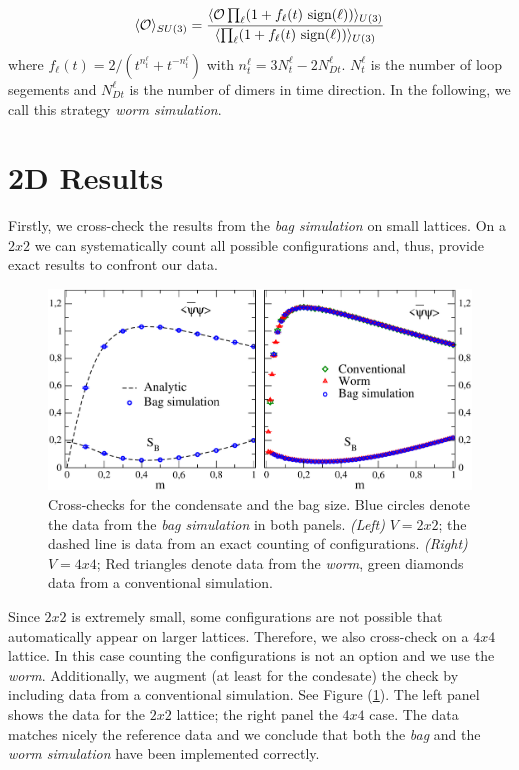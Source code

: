 \documentclass{PoS}
\begin{document}
\begin{equation}
\langle \mathcal{O} \rangle_{\tiny SU(3)} = \frac{\langle \mathcal{O} \prod_{\ell}(1 + f_{\ell}(t)\text{ sign}(\ell)) \rangle_{\tiny U(3)}}{\langle \prod_{\ell}(1 + f_{\ell}(t)\text{ sign}(\ell)) \rangle_{\tiny U(3)}}
\end{equation}
where $f_{\ell}(t) = 2/(t^{n^{\ell}_t} + t^{-n^{\ell}_t})$ with $n^{\ell}_t = 3N^{\ell}_t - 2N^{\ell}_{Dt}$. $N^{\ell}_t$ is the number of loop segements and $N^{\ell}_{Dt}$ is the number of dimers in time direction. In the following, we call this strategy \textit{worm simulation}.

\section{2D Results}

Firstly, we cross-check the results from the \textit{bag simulation} on small lattices. On a $2x2$ we can systematically count all possible configurations and, thus, provide exact results to confront our data. 
\begin{figure}
\centering
\includegraphics[width=0.7\linewidth]{Plots/Checks/Comb/V2n4_SB_cond_m0to1_combined.pdf}
\caption{Cross-checks for the condensate and the bag size. Blue circles denote the data from the \textit{bag simulation} in both panels. \textit{(Left)} $V = 2x2$; the dashed line is data from an exact counting of configurations. \textit{(Right)} $V = 4x4$; Red triangles denote data from the \textit{worm}, green diamonds data from a conventional simulation.}
\label{fig:check}
\end{figure}
Since $2x2$ is extremely small, some configurations are not possible that automatically appear on larger lattices.  Therefore, we also cross-check on a $4x4$ lattice. In this case counting the configurations is not an option and we use the \textit{worm}. Additionally, we augment (at least for the condesate) the check by including data from a conventional simulation. See Figure (\ref{fig:check}). The left panel shows the data for the $2x2$ lattice; the right panel the $4x4$ case. The data matches nicely the reference data and we conclude that both the \textit{bag} and the \textit{worm simulation} have been implemented correctly.
\end{document}
